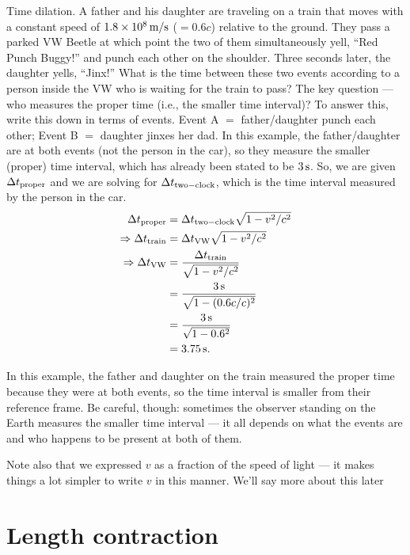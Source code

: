    
\begin{example}{Time dilation.}
A father and his daughter are traveling on a train that moves with a 
constant speed of $1.8\times 10^8\,\mbox{m/s}$ ($= 0.6c$)
relative to the ground.  They pass a parked VW Beetle at which point
the two of them simultaneously yell, ``Red Punch Buggy!'' and punch each
other on the shoulder.  Three seconds later, the daughter yells,
``Jinx!''  What is the time between these two events according to a
person inside the VW who is waiting for the train to pass?
\solution
The key question ---  who measures the proper time (i.e., the
smaller time interval)?  To answer this, write this down in terms of
events.  Event A $=$ father/daughter punch each other; Event B $=$
daughter jinxes her dad.  In this example, the father/daughter are at
both events (not the person in the car), so they measure the smaller
(proper) time interval, which has already been stated to be $3\,\mbox{s}$.  
So, we are given $\Delta t_{\rm proper}$ and we are solving for 
$\Delta t_{\rm two-clock}$, 
which is the time interval measured by the person in the car.
\begin{align}
\Delta t_{\rm proper} &= \Delta t_{\rm two-clock}\sqrt{1-v^2/c^2} \nonumber \\
\Rightarrow \Delta t_{\rm train} &= 
                \Delta t_{\rm VW}\sqrt{1-v^2/c^2}\nonumber \\
\Rightarrow \Delta t_{\rm VW} &= 
                \frac{\Delta t_{\rm train}}{\sqrt{1-v^2/c^2}}\nonumber \\
                   &= \frac{3\,\mbox{s}}{\sqrt{1-(0.6c/c)^2}}\nonumber \\
                   &= \frac{3\,\mbox{s}}{\sqrt{1-0.6^2}}\nonumber \\
                   &= 3.75\,\mbox{s}.
\end{align}
\end{example}

In this example, the father and daughter on the train measured the
proper time because they were at both events, so the time interval is
smaller from their reference frame.  Be careful, though: sometimes the
observer standing on the Earth measures the smaller time interval --- it
all depends on what the events are and who happens to be present at
both of them.
   
Note also that we expressed $v$ as a fraction of the speed of light --- it
makes things a lot simpler to write $v$ in this manner.  We'll say more
about this later

\section{Length contraction}

